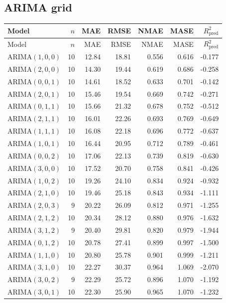 \documentclass[10pt,a4paper]{article}
\begin{document}
\subsection{ARIMA grid}
\begin{longtable}{lrrrrrr}
\toprule
Model & $n$ & MAE & RMSE & NMAE & MASE & $R^2_{\mathrm{pred}}$ \\
\midrule
\endfirsthead
\toprule
Model & $n$ & MAE & RMSE & NMAE & MASE & $R^2_{\mathrm{pred}}$ \\
\midrule
\endhead

ARIMA$(1,0,0)$ & 10 & 12.84 & 18.81 & 0.556 & 0.616 & -0.177 \\
ARIMA$(2,0,0)$ & 10 & 14.30 & 19.44 & 0.619 & 0.686 & -0.258 \\
ARIMA$(0,0,1)$ & 10 & 14.61 & 18.52 & 0.633 & 0.701 & -0.142 \\
ARIMA$(2,0,1)$ & 10 & 15.46 & 19.54 & 0.669 & 0.742 & -0.271 \\
ARIMA$(0,1,1)$ & 10 & 15.66 & 21.32 & 0.678 & 0.752 & -0.512 \\
ARIMA$(2,1,1)$ & 10 & 16.01 & 22.26 & 0.693 & 0.769 & -0.649 \\
ARIMA$(1,1,1)$ & 10 & 16.08 & 22.18 & 0.696 & 0.772 & -0.637 \\
ARIMA$(1,0,1)$ & 10 & 16.44 & 20.95 & 0.712 & 0.789 & -0.461 \\
ARIMA$(0,0,2)$ & 10 & 17.06 & 22.13 & 0.739 & 0.819 & -0.630 \\
ARIMA$(3,0,0)$ & 10 & 17.52 & 20.70 & 0.758 & 0.841 & -0.426 \\
ARIMA$(1,0,2)$ & 10 & 19.26 & 24.10 & 0.834 & 0.924 & -0.932 \\
ARIMA$(2,1,0)$ & 10 & 19.46 & 25.18 & 0.843 & 0.934 & -1.111 \\
ARIMA$(2,0,3)$ & 9 & 20.22 & 26.09 & 0.812 & 0.971 & -1.255 \\
ARIMA$(2,1,2)$ & 10 & 20.34 & 28.12 & 0.880 & 0.976 & -1.632 \\
ARIMA$(3,1,2)$ & 9 & 20.40 & 29.81 & 0.820 & 0.979 & -1.944 \\
ARIMA$(0,1,2)$ & 10 & 20.78 & 27.41 & 0.899 & 0.997 & -1.500 \\
ARIMA$(1,1,0)$ & 10 & 20.80 & 25.78 & 0.901 & 0.999 & -1.211 \\
ARIMA$(3,1,0)$ & 10 & 22.27 & 30.37 & 0.964 & 1.069 & -2.070 \\
ARIMA$(3,0,2)$ & 9 & 22.29 & 25.72 & 0.896 & 1.070 & -1.192 \\
ARIMA$(3,0,1)$ & 10 & 22.30 & 25.90 & 0.965 & 1.070 & -1.232 \\

\end{longtable}
\end{document}
